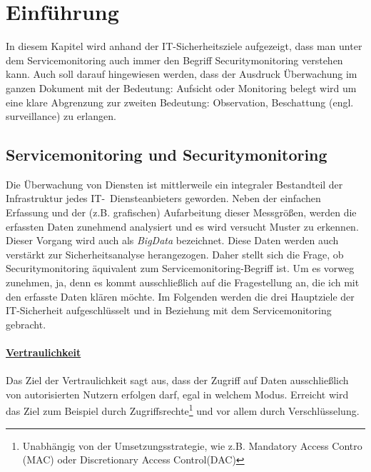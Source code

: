 \chapter{Einführung}
\thispagestyle{fancy}

In diesem Kapitel wird anhand der IT-Sicherheitsziele aufgezeigt, dass man unter dem
Servicemonitoring auch immer den Begriff Securitymonitoring verstehen
kann. Auch soll darauf hingewiesen werden, dass der Ausdruck Überwachung im ganzen
Dokument mit der Bedeutung: Aufsicht oder Monitoring belegt wird um eine klare Abgrenzung
zur zweiten Bedeutung: Observation, Beschattung (engl. surveillance) zu erlangen.


\section{Servicemonitoring und Securitymonitoring}

Die Überwachung von Diensten ist mittlerweile ein integraler Bestandteil der 
Infrastruktur jedes IT-~Diensteanbieters geworden. Neben der einfachen Erfassung
und der (z.B. grafischen) Aufarbeitung dieser Messgrößen, werden die erfassten Daten
zunehmend analysiert und es wird versucht Muster zu erkennen. Dieser Vorgang wird auch
als \textit{BigData} bezeichnet. Diese Daten werden auch verstärkt zur Sicherheitsanalyse
herangezogen. Daher stellt sich die Frage, ob Securitymonitoring äquivalent zum
Servicemonitoring-Begriff ist. Um es vorweg zunehmen, ja, denn es kommt ausschließlich auf
die Fragestellung an, die ich mit den erfasste Daten klären möchte. Im Folgenden werden 
die drei Hauptziele der IT-Sicherheit aufgeschlüsselt und in Beziehung mit dem 
Servicemonitoring gebracht.\\\\

\underline{\textbf{Vertraulichkeit}}\\\\
Das Ziel der Vertraulichkeit sagt aus, dass der Zugriff auf Daten ausschließlich von
autorisierten Nutzern erfolgen darf, egal in welchem Modus. Erreicht wird das Ziel zum
Beispiel durch Zugriffsrechte\footnote{Unabhängig von der Umsetzungsstrategie, wie z.B. 
Mandatory Access Contro (MAC) oder Discretionary Access Control(DAC)} und vor allem 
durch 
Verschlüsselung.\\

